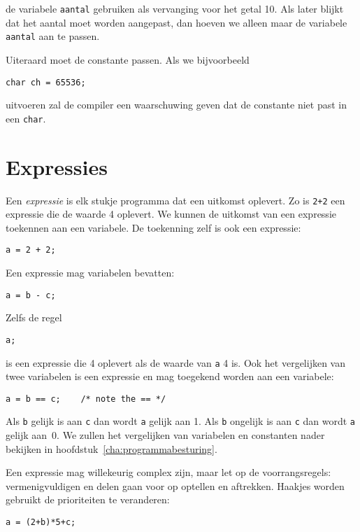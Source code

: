 de variabele \texttt{aantal} gebruiken als vervanging voor het getal 10. Als later blijkt dat het aantal moet worden aangepast, dan hoeven we alleen maar de variabele \texttt{aantal} aan te passen.

Uiteraard moet de constante passen. Als we bijvoorbeeld

\hspace*{1em}\texttt{char ch = 65536;}

uitvoeren zal de compiler een waarschuwing geven dat de constante niet past in een \texttt{char}.


\section{Expressies}
Een \textsl{expressie} is elk stukje programma dat een uitkomst oplevert. Zo is \texttt{2+2} een expressie die de waarde 4 oplevert. We kunnen de uitkomst van een expressie toekennen aan een variabele. De toekenning zelf is ook een expressie:

\hspace*{1em}\texttt{a = 2 + 2;}

Een expressie mag variabelen bevatten:

\hspace*{1em}\texttt{a = b - c;}

Zelfs de regel

\hspace*{1em}\texttt{a;}

is een expressie die 4 oplevert als de waarde van \texttt{a} 4 is. Ook het vergelijken van twee variabelen is een expressie en mag toegekend worden aan een variabele:

\hspace*{1em}\texttt{a = b == c; \ \ \  /* note the == */}

Als \texttt{b} gelijk is aan \texttt{c} dan wordt \texttt{a} gelijk aan 1. Als \texttt{b} ongelijk is aan \texttt{c} dan wordt \texttt{a} gelijk aan~0. We zullen het vergelijken van variabelen en constanten nader bekijken in hoofdstuk~\ref{cha:programmabesturing}.

Een expressie mag willekeurig complex zijn, maar let op de voorrangsregels: vermenigvuldigen en delen gaan voor op optellen en aftrekken. Haakjes worden gebruikt de prioriteiten te veranderen:

\hspace*{1em}\texttt{a = (2+b)*5+c;}

